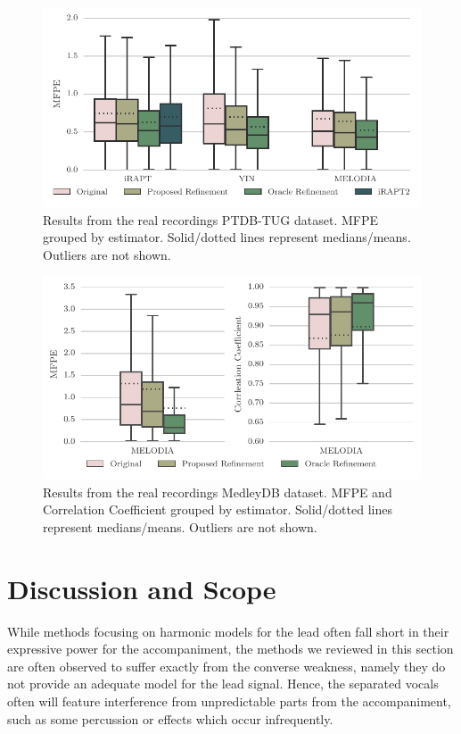 \begin{figure}[t!]
\centering
		\includegraphics[width=0.90\columnwidth]{Chapters/05_Separation_Known/figures/stats_boxplot_ptdb_real.pdf}
\caption{Results from the real recordings PTDB-TUG dataset. MFPE grouped by estimator. Solid/dotted lines represent medians/means. Outliers are not shown.}
\label{fig:ptdbtug_real}
\end{figure}

\begin{figure}[t]
\centering
		\includegraphics[width=0.90\columnwidth]{Chapters/05_Separation_Known/figures/stats_boxplot_medley.pdf}
\caption{Results from the real recordings MedleyDB dataset. MFPE and Correlation Coefficient grouped by estimator. Solid/dotted lines represent medians/means. Outliers are not shown.}
\label{fig:medley}
\end{figure}

\section{Discussion and Scope}

While methods focusing on harmonic models for the lead often fall short in their expressive power for the accompaniment, the methods we reviewed in this section are often observed to suffer exactly from the converse weakness, namely they do not provide an adequate model for the lead signal. Hence, the separated vocals often will feature interference from unpredictable parts from the accompaniment, such as some percussion or effects which occur infrequently.

